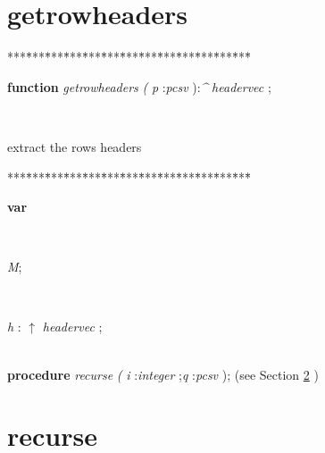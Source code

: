 \section{getrowheaders}\label{sec:csvfilereader/getdatamatrix/recursedown/recurse/getcolheaders/recursegetrowheaders}

\begin{tabbing}
***\=***\=***\=***\=***\=***\=***\=***\=***\=***\=***\=***\=***\=\kill
\parbox{14cm}{\textsf{\textbf{function}  \textit{getrowheaders} \textit{(} \textit{p} :\textit{pcsv} ):\textit{\^{}} \textit{headervec} ;}}\\
\end{tabbing}
extract the rows headers
\begin{tabbing}
***\=***\=***\=***\=***\=***\=***\=***\=***\=***\=***\=***\=***\=\kill
\\
\+\parbox{14cm}{\textsf{\textbf{var} }}\\
\parbox{14cm}{\textsf{\textit{M}}; }\\
\parbox{14cm}{\textsf{\textit{h} : $\uparrow$ \textit{headervec} }; }\\
\<\textsf{\textbf{procedure}  \textit{recurse} \textit{(} \textit{i} :\textit{integer} ;\textit{q} :\textit{pcsv} );} (see Section \ref{sec:csvfilereader/getdatamatrix/recursedown/recurse/getcolheaders/recurse/getrowheadersrecurse} )\\
\end{tabbing}
\section{recurse}\label{sec:csvfilereader/getdatamatrix/recursedown/recurse/getcolheaders/recurse/getrowheadersrecurse}

